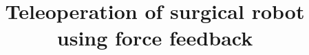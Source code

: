 \documentclass[conference]{IEEEtran}
\begin{document}
%
\graphicspath{ {../Worksheets/rapport/pictures/} }


\title{Teleoperation of surgical robot using force feedback}


\author{
\and
{}
\and
{}
\and
{}
}


%








\maketitle
\end{document}
